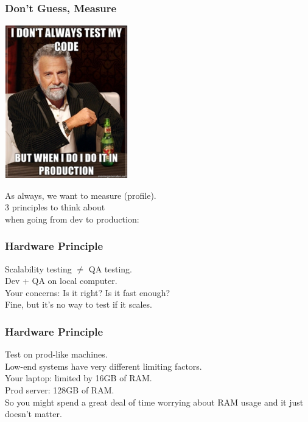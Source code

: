 \begin{frame}
\frametitle{Don't Guess, Measure}


\begin{center}
	\includegraphics[width=0.4\textwidth]{images/testinprod.png}
\end{center}

\begin{changemargin}{2cm}
As always, we want to measure (profile).\\[1em]
3 principles to think about\\
when going from dev to production:
\end{changemargin}



\end{frame}



\begin{frame}
\frametitle{Hardware Principle}


\begin{changemargin}{2cm}
Scalability testing $\neq$  QA testing.\\[1em]

Dev + QA on local computer.\\
Your concerns: Is it right? Is it fast enough?\\[1em]

Fine, but it's no way to test if it scales. 
\end{changemargin}

\end{frame}



\begin{frame}
\frametitle{Hardware Principle}


\begin{changemargin}{2cm}
Test on prod-like machines.\\[1em]
Low-end systems have very different limiting factors. \\[1em]
Your laptop: limited by 16GB of RAM.\\
Prod server: 128GB of RAM.\\[1em]
So you might spend a great deal of time worrying about RAM usage and it just doesn't matter.
\end{changemargin}

\end{frame}



